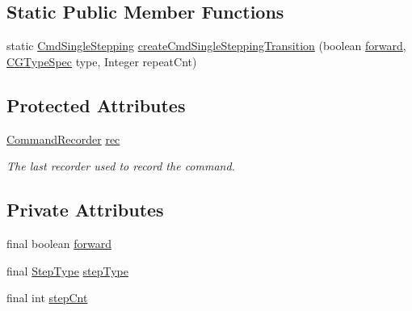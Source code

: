 \subsection*{Static Public Member Functions}
\begin{DoxyCompactItemize}
\item 
static \hyperlink{classgov_1_1nasa_1_1jpf_1_1inspector_1_1client_1_1commands_1_1_cmd_single_stepping}{Cmd\+Single\+Stepping} \hyperlink{classgov_1_1nasa_1_1jpf_1_1inspector_1_1client_1_1commands_1_1_cmd_single_stepping_a7d487203117503a88884efc6592e5b39}{create\+Cmd\+Single\+Stepping\+Transition} (boolean \hyperlink{classgov_1_1nasa_1_1jpf_1_1inspector_1_1client_1_1commands_1_1_cmd_single_stepping_af3bd26b0ee3e4a353b369b84e61db07c}{forward}, \hyperlink{enumgov_1_1nasa_1_1jpf_1_1inspector_1_1client_1_1commands_1_1_cmd_choice_generators_tracking_1_1_c_g_type_spec}{C\+G\+Type\+Spec} type, Integer repeat\+Cnt)
\end{DoxyCompactItemize}
\subsection*{Protected Attributes}
\begin{DoxyCompactItemize}
\item 
\hyperlink{classgov_1_1nasa_1_1jpf_1_1inspector_1_1client_1_1_command_recorder}{Command\+Recorder} \hyperlink{classgov_1_1nasa_1_1jpf_1_1inspector_1_1client_1_1_client_command_af4246f2427035c72a6af45a2c61361f7}{rec}
\begin{DoxyCompactList}\small\item\em The last recorder used to record the command. \end{DoxyCompactList}\end{DoxyCompactItemize}
\subsection*{Private Attributes}
\begin{DoxyCompactItemize}
\item 
final boolean \hyperlink{classgov_1_1nasa_1_1jpf_1_1inspector_1_1client_1_1commands_1_1_cmd_single_stepping_af3bd26b0ee3e4a353b369b84e61db07c}{forward}
\item 
final \hyperlink{enumgov_1_1nasa_1_1jpf_1_1inspector_1_1interfaces_1_1_commands_interface_1_1_step_type}{Step\+Type} \hyperlink{classgov_1_1nasa_1_1jpf_1_1inspector_1_1client_1_1commands_1_1_cmd_single_stepping_a9888f2543c87e6e21a850b215d79b389}{step\+Type}
\item 
final int \hyperlink{classgov_1_1nasa_1_1jpf_1_1inspector_1_1client_1_1commands_1_1_cmd_single_stepping_ab1cc3aed83fbe2c9d20fb0ec8f1bda02}{step\+Cnt}
\end{DoxyCompactItemize}


